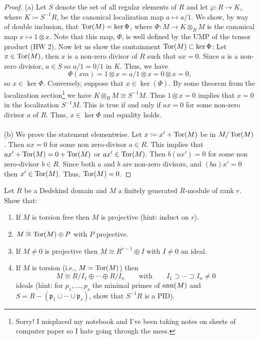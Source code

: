 \begin{proof}
(a) Let $S$ denote the set of all regular elements of $R$ and let
$\varphi\colon R\to K$, where $K\coloneqq S^{-1}R$, be the canonical
localization map $a\mapsto a/1$. We show, by way of double inclusion, that
$\operatorname{Tor}(M)=\ker\Phi$, where $\Phi\colon M\to K\otimes_R M$ is the
canonical map $x\mapsto 1\otimes x$. Note that this map, $\Phi$, is well
defined by the UMP of the tensor product (HW 2). Now let us show the
containment $\operatorname{Tor}(M)\subset\ker\Phi$: Let $x\in\operatorname{Tor}(M)$, then
$x$ is a non-zero divisor of $R$ such that $ax=0$. Since $a$ is a non-zero
divisior, $a\in S$ so $a/1=0/1$ in $K$. Thus, we have
\[
\Phi(xm)=1\otimes x=a/1\otimes x=0\otimes x=0,
\]
so $x\in\ker\Phi$. Conversely, suppose that $x\in\ker(\Phi)$. By some
theorem from the localization section\footnote{Sorry! I misplaced my
notebook and I've been taking notes on sheets of computer paper so I hate
going through the mess.} we have $K\otimes_R M\cong S^{-1}M$. Thus
$1\otimes x=0$ implies that $x=0$ in the localization $S^{-1}M$. This is
true if and only if $ax=0$ for some non-zero divisor $a$ of $R$. Thus,
$x\in\ker\Phi$ and equality holds.
\\\\
(b) We prove the statement elementwise. Let $x\coloneqq x'+\operatorname{Tor}(M)$
be in $M/\operatorname{Tor}(M)$. Then $ax=0$ for some non zero-divisor $a\in
R$. This implies that $ax'+\operatorname{Tor}(M)=0+\operatorname{Tor}(M)$ or
$ax'\in\operatorname{Tor}(M)$. Then $b(ax')=0$ for some non zero-divisor $b\in R$. Since
both $a$ and $b$ are non-zero divisors, and $(ba)x'=0$ then
$x'\in\operatorname{Tor}(M)$. Thus, $\operatorname{Tor}(M)=0$.
\end{proof}
\newpage
\begin{problem}
Let $R$ be a Dedekind domain and $M$ a finitely generated $R$-module of
rank $r$. Show that:
\begin{enumerate}[label=(\alph*)]
\item If $M$ is torsion free then $M$ is projective (hint: induct on $r$).
\item $M\cong \operatorname{Tor}(M)\oplus P$ with $P$ projective.
\item If $M\neq 0$ is projective then $M\cong R^{r-1}\oplus I$ with $I\neq
  0$ an ideal.
\item If $M$ is torsion (i.e., $M=\operatorname{Tor}(M)$) then
\[
M\cong R/I_1\oplus\cdots\oplus R/I_n\qquad\text{with}\qquad
I_1\supset\cdots\supset I_n\neq 0
\]
ideals (hint: for $p_1,...,p_s$ the minimal primes of $\operatorname{ann}(M)$ and
$S=R\minus(\mathfrak{p}_1\cup\cdots\cup\mathfrak{p}_s)$, show that
$S^{-1}R$ is a PID).
\end{enumerate}
\end{problem}
